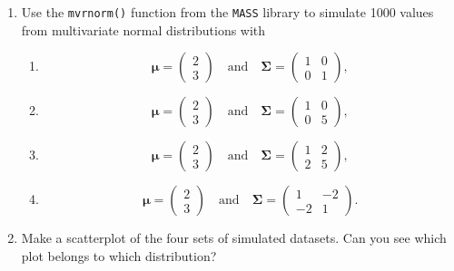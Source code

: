 \documentclass[]{article}
\begin{document}
\begin{enumerate}
\def\labelenumi{\alph{enumi})}
\item
  Use the \texttt{mvrnorm()} function from the \texttt{MASS} library to
  simulate 1000 values from multivariate normal distributions with

  \begin{enumerate}
  \def\labelenumii{\roman{enumii})}
  \item
    \[ \boldsymbol{\mu} = \begin{pmatrix}
    2 \\
    3 
    \end{pmatrix} \quad \text{and} \quad \boldsymbol{\Sigma} = \begin{pmatrix}
    1 & 0\\
    0 & 1
    \end{pmatrix},\]
  \item
    \[ \boldsymbol{\mu} = \begin{pmatrix}
    2 \\
    3 
    \end{pmatrix} \quad \text{and} \quad \boldsymbol{\Sigma} = \begin{pmatrix}
    1 & 0\\
    0 & 5
    \end{pmatrix},\]
  \item
    \[ \boldsymbol{\mu} = \begin{pmatrix}
    2 \\
    3 
    \end{pmatrix} \quad \text{and} \quad \boldsymbol{\Sigma} = \begin{pmatrix}
    1 & 2\\
    2 & 5
    \end{pmatrix},\]
  \item
    \[ \boldsymbol{\mu} = \begin{pmatrix}
    2 \\
    3 
    \end{pmatrix} \quad \text{and} \quad \boldsymbol{\Sigma} = \begin{pmatrix}
    1 & -2\\
    -2 & 1
    \end{pmatrix}.\]
  \end{enumerate}
\item
  Make a scatterplot of the four sets of simulated datasets. Can you see
  which plot belongs to which distribution?
\end{enumerate}
\end{document}
